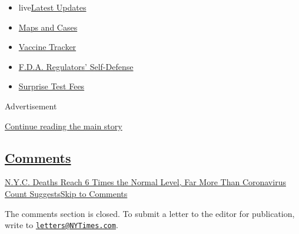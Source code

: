 \begin{itemize}
\tightlist
\item
  live\href{https://www.nytimes3xbfgragh.onion/2020/09/11/world/covid-19-coronavirus.html?name=styln-coronavirus-national\&region=TOP_BANNER\&block=storyline_menu_recirc\&action=click\&pgtype=Interactive\&impression_id=c5d1c400-f4b8-11ea-b7e2-937559d5cb01\&variant=undefined}{Latest
  Updates}
\item
  \href{https://www.nytimes3xbfgragh.onion/interactive/2020/us/coronavirus-us-cases.html?name=styln-coronavirus-national\&region=TOP_BANNER\&block=storyline_menu_recirc\&action=click\&pgtype=Interactive\&impression_id=c5d1c401-f4b8-11ea-b7e2-937559d5cb01\&variant=undefined}{Maps
  and Cases}
\item
  \href{https://www.nytimes3xbfgragh.onion/interactive/2020/science/coronavirus-vaccine-tracker.html?name=styln-coronavirus-national\&region=TOP_BANNER\&block=storyline_menu_recirc\&action=click\&pgtype=Interactive\&impression_id=c5d1c402-f4b8-11ea-b7e2-937559d5cb01\&variant=undefined}{Vaccine
  Tracker}
\item
  \href{https://www.nytimes3xbfgragh.onion/2020/09/10/us/politics/fda-coronavirus-vaccine.html?name=styln-coronavirus-national\&region=TOP_BANNER\&block=storyline_menu_recirc\&action=click\&pgtype=Interactive\&impression_id=c5d1c403-f4b8-11ea-b7e2-937559d5cb01\&variant=undefined}{F.D.A.
  Regulators' Self-Defense}
\item
  \href{https://www.nytimes3xbfgragh.onion/2020/09/09/upshot/coronavirus-surprise-test-fees.html?name=styln-coronavirus-national\&region=TOP_BANNER\&block=storyline_menu_recirc\&action=click\&pgtype=Interactive\&impression_id=c5d1c404-f4b8-11ea-b7e2-937559d5cb01\&variant=undefined}{Surprise
  Test Fees}
\end{itemize}

Advertisement

\protect\hyperlink{after-top}{Continue reading the main story}

\hypertarget{comments}{%
\subsection{\texorpdfstring{\protect\hyperlink{commentsContainer}{Comments}}{Comments}}\label{comments}}

\href{}{N.Y.C. Deaths Reach 6 Times the Normal Level, Far More Than
Coronavirus Count Suggests}\href{}{Skip to Comments}

The comments section is closed. To submit a letter to the editor for
publication, write to
\href{mailto:letters@NYTimes.com}{\nolinkurl{letters@NYTimes.com}}.


